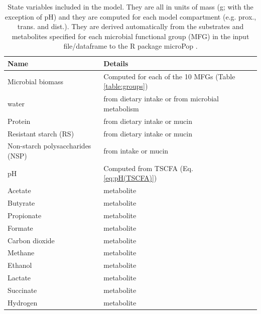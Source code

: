 \documentclass[a4paper]{article}
\begin{document}
\begin{table}[ht]
    \caption{State variables included in the model. They are all in units of mass (g; with the exception of pH) and they are computed for each model compartment (e.g. prox., trans. and dist.). They are derived automatically from the substrates and metabolites specified for each microbial functional group (MFG) in the input file/dataframe to the R package microPop \cite{Kettle2018}.}
\begin{tabular}{|l|l|l|}
\hline
Name &  Details\\
\hline
Microbial biomass & Computed for each of the 10  MFGs (Table \ref{table:groups})\\
\hline
water  & from dietary intake or from microbial metabolism \\
Protein  & from dietary intake or mucin\\
Resistant starch (RS)  & from dietary intake or mucin\\
Non-starch polysaccharides (NSP)  & from intake or mucin\\
\hline
pH & Computed from TSCFA (Eq. \ref{eq:pH(TSCFA)})\\
\hline
Acetate &   metabolite\\
Butyrate &   metabolite\\
Propionate  &  metabolite\\
Formate &  metabolite \\
Carbon dioxide &  metabolite \\
Methane &  metabolite \\
Ethanol &  metabolite \\
Lactate &  metabolite \\
Succinate &  metabolite\\
Hydrogen &  metabolite\\
\hline
\end{tabular}
\label{table:stateVariables}
\end{table}
\end{document}
